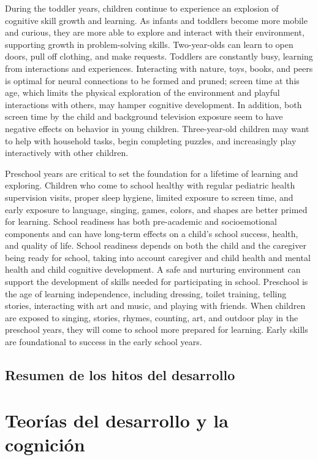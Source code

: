 During the toddler years, children continue to experience an explosion of
cognitive skill growth and learning. As infants and toddlers become more mobile
and curious, they are more able to explore and interact with their environment,
supporting growth in problem-solving skills. Two-year-olds can learn to open
doors, pull off clothing, and make requests. Toddlers are constantly busy,
learning from interactions and experiences. Interacting with nature, toys,
books, and peers is optimal for neural connections to be formed and pruned;
screen time at this age, which limits the physical exploration of the
environment and playful interactions with others, may hamper cognitive
development. In addition, both screen time by the child and background
television exposure seem to have negative effects on behavior in young
children. Three-year-old children may want to help with household tasks, begin
completing puzzles, and increasingly play interactively with other children.
\cite{Crotty2023}

Preschool years are critical to set the foundation for a lifetime of learning
and exploring. Children who come to school healthy with regular pediatric
health supervision visits, proper sleep hygiene, limited exposure to screen
time, and early exposure to language, singing, games, colors, and shapes are
better primed for learning. School readiness has both pre-academic and
socioemotional components and can have long-term effects on a child’s school
success, health, and quality of life. School readiness depends on both the
child and the caregiver being ready for school, taking into account caregiver
and child health and mental health and child cognitive development. A safe and
nurturing environment can support the development of skills needed for
participating in school. Preschool is the age of learning independence,
including dressing, toilet training, telling stories, interacting with art and
music, and playing with friends. When children are exposed to singing, stories,
rhymes, counting, art, and outdoor play in the preschool years, they will come
to school more prepared for learning. Early skills are foundational to success
in the early school years. \cite{Crotty2023}

\subsection{Resumen de los hitos del desarrollo}

\section{Teorías del desarrollo y la cognición}
